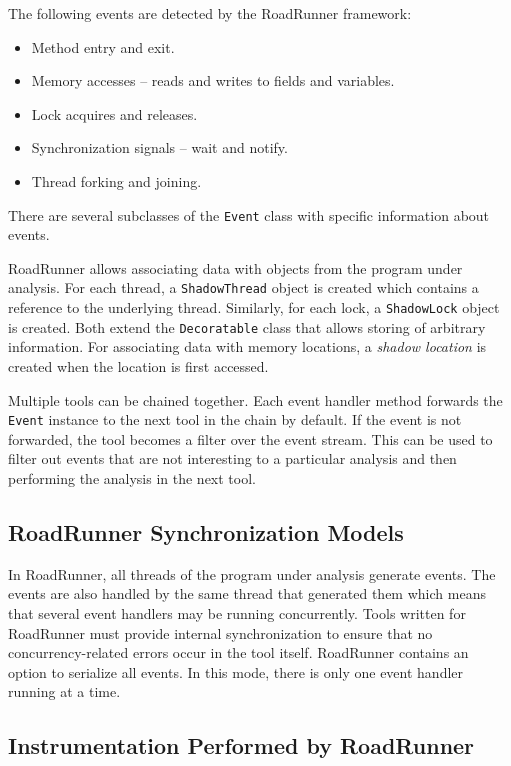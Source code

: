 The following events are detected by the RoadRunner framework:
\begin{itemize}
    \item Method entry and exit.
    \item Memory accesses -- reads and writes to fields and variables.
    \item Lock acquires and releases.
    \item Synchronization signals -- wait and notify.
    \item Thread forking and joining.
\end{itemize}

There are several subclasses of the \texttt{Event} class with specific
information about events.

RoadRunner allows associating data with objects from the program under analysis.
For each thread, a \texttt{ShadowThread} object is created which contains a
reference to the underlying thread. Similarly, for each lock, a
\texttt{ShadowLock} object is created. Both extend the \texttt{Decoratable}
class that allows storing of arbitrary information. For associating data with
memory locations, a \emph{shadow location} is created when the location is first
accessed.

Multiple tools can be chained together. Each event handler method forwards the
\texttt{Event} instance to the next tool in the chain by default. If the event
is not forwarded, the tool becomes a filter over the event stream. This can be
used to filter out events that are not interesting to a particular analysis and
then performing the analysis in the next tool.

\subsection{RoadRunner Synchronization Models}

In RoadRunner, all threads of the program under analysis generate events. The
events are also handled by the same thread that generated them which means that
several event handlers may be running concurrently. Tools written for RoadRunner
must provide internal synchronization to ensure that no concurrency-related
errors occur in the tool itself. RoadRunner contains an option to serialize all
events. In this mode, there is only one event handler running at a time.

\subsection{Instrumentation Performed by RoadRunner}

